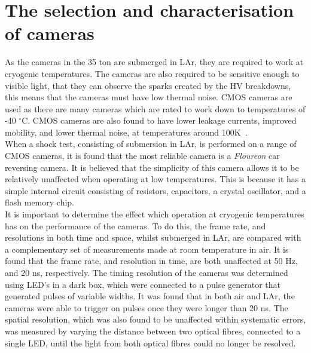 \section{The selection and characterisation of cameras} \label{sec:CamSelec} %
As the cameras in the 35 ton are submerged in LAr, they are required to work at cryogenic temperatures. The cameras are also required to be sensitive enough to visible light, that they can observe the sparks created by the HV breakdowns, this means that the cameras must have low thermal noise. CMOS cameras are used as there are many cameras which are rated to work down to temperatures of -40 $^{\circ}$C. CMOS cameras are also found to have lower leakage currents, improved mobility, and lower thermal noise, at temperatures around 100K~\citep{thermalnoise1,thermalnoise2}. \\

When a shock test, consisting of submersion in LAr, is performed on a range of CMOS cameras, it is found that the most reliable camera is a \emph{Floureon} car reversing camera. It is believed that the simplicity of this camera allows it to be relatively unaffected when operating at low temperatures. This is because it has a simple internal circuit consisting of resistors, capacitors, a crystal oscillator, and a flash memory chip. \\

It is important to determine the effect which operation at cryogenic temperatures has on the performance of the cameras. To do this, the frame rate, and resolutions in both time and space, whilst submerged in LAr, are compared with a complementary set of measurements made at room temperature in air. It is found that the frame rate, and resolution in time, are both unaffected at 50 Hz, and 20 ns, respectively. The timing resolution of the cameras was determined using LED's in a dark box, which were connected to a pulse generator that generated pulses of variable widths. It was found that in both air and LAr, the cameras were able to trigger on pulses once they were longer than 20 ns. The spatial resolution, which was also found to be unaffected within systematic errors, was measured by varying the distance between two optical fibres, connected to a single LED, until the light from both optical fibres could no longer be resolved. \\

